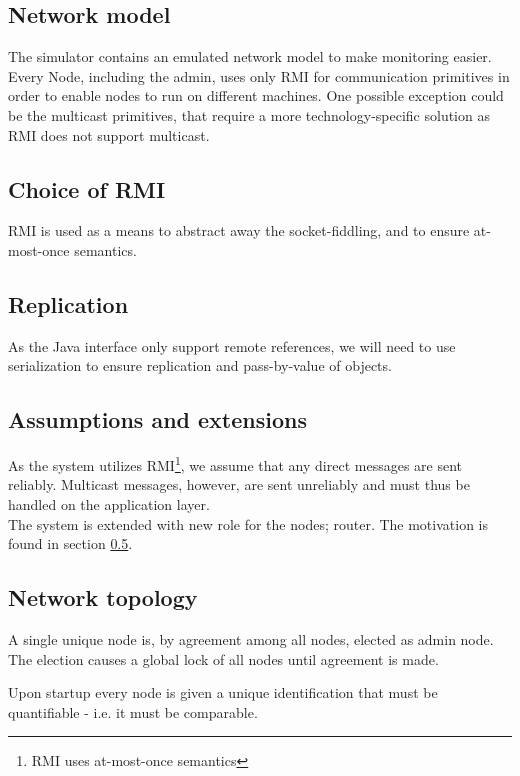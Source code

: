 \documentclass[10pt,a4paper]{article}
\begin{document}
\subsection{Network model}
The simulator contains an emulated network model to make monitoring easier. Every Node, including the admin, uses only RMI for communication primitives in order to enable nodes to run on different machines.
One possible exception could be the multicast primitives, that require a more technology-specific solution as RMI does not support multicast.

\subsection{Choice of RMI}
RMI is used as a means to abstract away the socket-fiddling, and to ensure at-most-once semantics.

\subsection{Replication}
As the Java interface  only support remote references, we will need to use serialization to ensure replication and pass-by-value of objects.

\subsection{Assumptions and extensions}
As the system utilizes RMI\footnote{RMI uses at-most-once semantics}, we assume that any direct messages are sent reliably. Multicast messages, however, are sent unreliably and must thus be handled on the application layer.\\

The system is extended with new role for the nodes; router. The motivation is found in section \ref{network_topology}.

\subsection{Network topology}
\label{network_topology}
A single unique node is, by agreement among all nodes, elected as admin node. The election causes a global lock of all nodes until agreement is made.

Upon startup every node is given a unique identification that must be quantifiable - i.e. it must be comparable.
\end{document}
